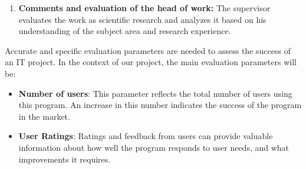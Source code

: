 \documentclass{article}
\begin{document}
\begin{minipage}{0.49\textwidth}
\begin{enumerate}
            \item \textbf{Comments and evaluation of the head of work:} The supervisor evaluates the work as scientific research and analyzes it based on his understanding of the subject area and research experience.
        \end{enumerate}
        Accurate and specific evaluation parameters are needed to assess the success of an IT project. In the context of our project, the main evaluation parameters will be:
        \begin{itemize}
            \item \textbf{Number of users}: This parameter reflects the total number of users using this program. An increase in this number indicates the success of the program in the market.
            \item \textbf{User Ratings}: Ratings and feedback from users can provide valuable information about how well the program responds to user needs, and what improvements it requires.
        \end{itemize}
    \end{minipage}
    \hfill
\end{document}
